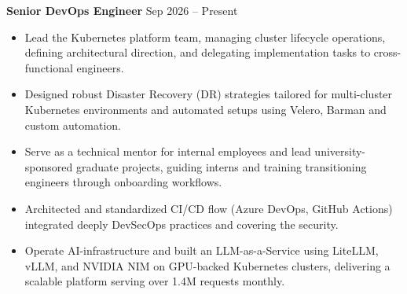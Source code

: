 \documentclass[a4paper,9pt]{extarticle}
\begin{document}
{\textbf{Senior DevOps Engineer}} \hfill {\footnotesize\textcolor{muted}{Sep 2026 -- Present}}\par\vspace{-2pt}
\begin{itemize}[before=\linespread{1.2}\selectfont]
	\item Lead the Kubernetes platform team, managing cluster lifecycle operations, defining architectural direction, and delegating implementation tasks to cross-functional engineers.
	\item Designed robust Disaster Recovery (DR) strategies tailored for multi-cluster Kubernetes environments and automated setups using Velero, Barman and custom automation.
	\item Serve as a technical mentor for internal employees and lead university-sponsored graduate projects, guiding interns and training transitioning engineers through onboarding workflows.
	\item Architected and standardized CI/CD flow (Azure DevOps, GitHub Actions) integrated deeply DevSecOps practices and covering the security.
	\item Operate AI-infrastructure and built an LLM-as-a-Service using LiteLLM, vLLM, and NVIDIA NIM on GPU-backed Kubernetes clusters, delivering a scalable platform serving over 1.4M requests monthly.
\end{itemize}
\vspace{4pt}
\end{document}

